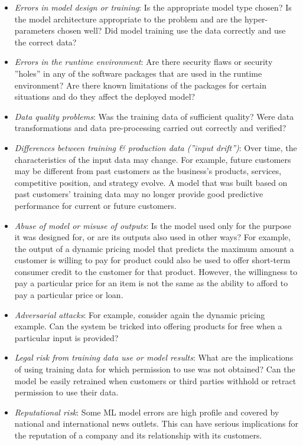 \begin{itemize}
   \item \emph{Errors in model design or training}: Is the appropriate model type chosen? Is the model architecture appropriate to the problem and are the hyper-parameters chosen well? Did model training use the data correctly and use the correct data?
   \item \emph{Errors in the runtime environment}: Are there security flaws or security ''holes'' in any of the software packages that are used in the runtime environment? Are there known limitations of the packages for certain situations and do they affect the deployed model?
   \item \emph{Data quality problems}: Was the training data of sufficient quality? Were data transformations and data pre-processing carried out correctly and verified?
   \item \emph{Differences between training \& production data (''input drift'')}: Over time, the characteristics of the input data may change. For example, future customers may be different from past customers as the business's products, services, competitive position, and strategy evolve. A model that was built based on past customers' training data may no longer provide good predictive performance for current or future customers. 
   \item \emph{Abuse of model or misuse of outputs}: Is the model used only for the purpose it was designed for, or are its outputs also used in other ways? For example, the output of a dynamic pricing model that predicts the maximum amount a customer is willing to pay for product could also be used to offer short-term consumer credit to the customer for that product. However, the willingness to pay a particular price for an item is not the same as the ability to afford to pay a particular price or loan.
   \item \emph{Adversarial attacks}: For example, consider again the dynamic pricing example. Can the system be tricked into offering products for free when a particular input is provided?
   \item \emph{Legal risk from training data use or model results}: What are the implications of using training data for which permission to use was not obtained? Can the model be easily retrained when customers or third parties withhold or retract permission to use their data.
   \item \emph{Reputational risk}: Some ML model errors are high profile and covered by national and international news outlets. This can have serious implications for the reputation of a company and its relationship with its customers. 
\end{itemize}

